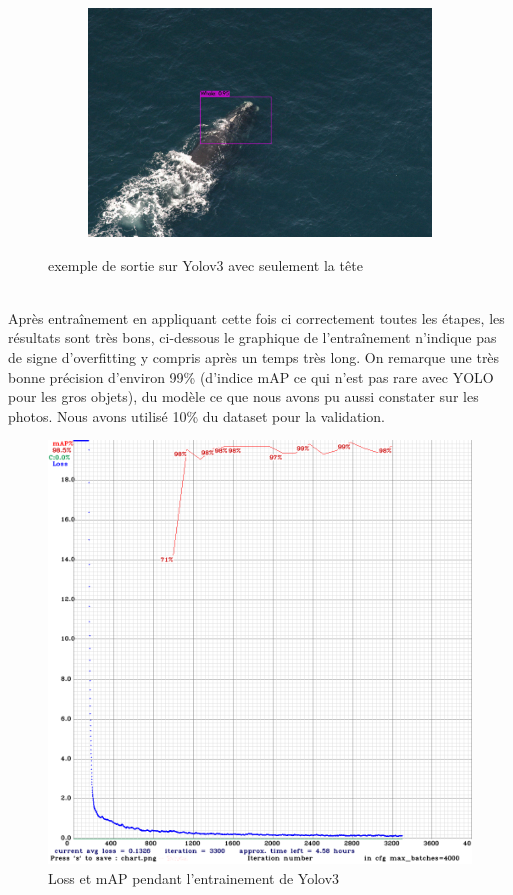 \documentclass[12pt,a4paper]{report}
\begin{document}
\begin{spacing}{1.5}
\begin{figure}[H]
\begin{subfigure}{0.45\textwidth}
\includegraphics[width=\linewidth]{figures/sortie/yolov3/predictionshead2.jpg}
\end{subfigure}
\caption{exemple de sortie sur Yolov3 avec seulement la tête}
\end{figure}
\\
Après entraînement en appliquant cette fois ci correctement toutes les étapes, les résultats sont très bons, ci-dessous le graphique de l'entraînement n'indique pas de signe d'overfitting y compris après un temps très long. On remarque une très bonne précision d'environ 99\% (d'indice mAP ce qui n'est pas rare avec YOLO pour les gros objets), du modèle ce que nous avons pu aussi constater sur les photos. Nous avons utilisé 10\% du dataset pour la validation.
\\
\newpage

\begin{figure}[H]
\includegraphics[scale=0.44]{figures/sortie/yolov3/chart_yolov3_training.png}
\caption{Loss et mAP pendant l'entrainement de Yolov3}
\end{figure}\\


\end{spacing}
\end{document}
